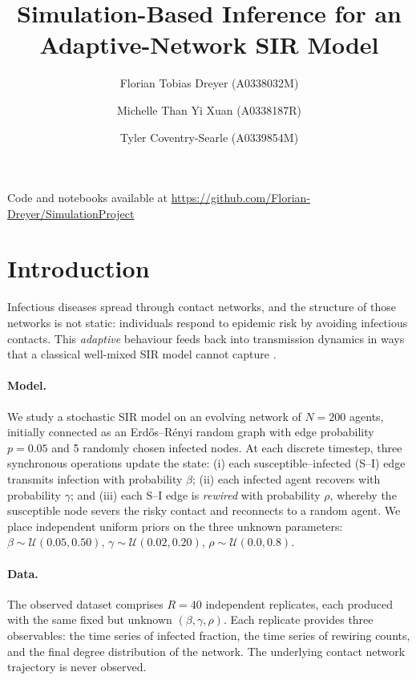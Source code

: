 \documentclass[11pt, a4paper]{article}
\title{\textbf{Simulation-Based Inference for an Adaptive-Network SIR Model}}
\author{%
  Florian Tobias Dreyer (A0338032M) \and
  Michelle Than Yi Xuan (A0338187R) \and
  Tyler Coventry-Searle (A0339854M)
}
\date{}
\begin{document}
\maketitle
\thispagestyle{empty}

\begin{center}
  \small Code and notebooks available at
  \url{https://github.com/Florian-Dreyer/SimulationProject}
\end{center}

\section{Introduction}
\label{sec:intro}

Infectious diseases spread through contact networks, and the structure of those
networks is not static: individuals respond to epidemic risk by avoiding
infectious contacts.
This \emph{adaptive} behaviour feeds back into transmission dynamics in ways
that a classical well-mixed SIR model cannot capture \citep{gross2006}.

\paragraph{Model.}
We study a stochastic SIR model on an evolving network of $N=200$ agents,
initially connected as an Erdős–Rényi random graph with edge probability
$p=0.05$ and 5 randomly chosen infected nodes.
At each discrete timestep, three synchronous operations update the state:
(i) each susceptible--infected (S--I) edge transmits infection with probability
$\beta$; (ii) each infected agent recovers with probability $\gamma$; and
(iii) each S--I edge is \emph{rewired} with probability $\rho$, whereby the
susceptible node severs the risky contact and reconnects to a random agent.
We place independent uniform priors on the three unknown parameters:
$\beta \sim \mathcal{U}(0.05, 0.50)$,
$\gamma \sim \mathcal{U}(0.02, 0.20)$,
$\rho \sim \mathcal{U}(0.0, 0.8)$.

\paragraph{Data.}
The observed dataset comprises $R=40$ independent replicates, each produced
with the same fixed but unknown $(\beta,\gamma,\rho)$.
Each replicate provides three observables: the time series of infected fraction,
the time series of rewiring counts, and the final degree distribution of the
network. The underlying contact network trajectory is never observed.
\end{document}
